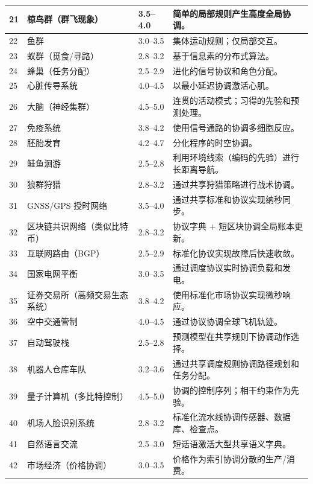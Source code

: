 \documentclass[11pt,a4paper]{article}
\begin{document}
\begin{longtable}{|p{0.8cm}|p{6.2cm}|p{3.0cm}|p{5.7cm}|}
	\hline
	21 & 椋鸟群（群飞现象） & 3.5--4.0 & 简单的局部规则产生高度全局协调。 \\
	\hline
	22 & 鱼群 & 3.0--3.5 & 集体运动规则；仅局部交互。 \\
	\hline
	23 & 蚁群（觅食/寻路） & 2.8--3.2 & 基于信息素的分布式算法。 \\
	\hline
	24 & 蜂巢（任务分配） & 2.5--2.9 & 进化的信号协议和角色分配。 \\
	\hline
	25 & 心脏传导系统 & 4.0--4.5 & 以最小延迟协调激活心肌。 \\
	\hline
	26 & 大脑（神经集群） & 4.5--5.0 & 连贯的活动模式；习得的先验和预测处理。 \\
	\hline
	27 & 免疫系统 & 3.8--4.2 & 使用信号通路的协调多细胞反应。 \\
	\hline
	28 & 胚胎发育 & 4.2--4.7 & 分化程序的时空协调。 \\
	\hline
	29 & 鲑鱼洄游 & 2.5--2.8 & 利用环境线索（编码的先验）进行长距离导航。 \\
	\hline
	30 & 狼群狩猎 & 2.8--3.2 & 通过共享狩猎策略进行战术协调。 \\
	\hline
	31 & GNSS/GPS 授时网络 & 3.5--4.0 & 通过共享标准和协议实现纳秒同步。 \\
	\hline
	32 & 区块链共识网络（类似比特币） & 2.8--3.2 & 协议字典 + 短区块协调全局账本更新。 \\
	\hline
	33 & 互联网路由（BGP） & 2.5--2.9 & 标准化协议实现故障后快速收敛。 \\
	\hline
	34 & 国家电网平衡 & 3.0--3.5 & 通过调度协议实时协调负载和发电。 \\
	\hline
	35 & 证券交易所（高频交易生态系统） & 3.8--4.2 & 使用标准化市场协议实现微秒响应。 \\
	\hline
	36 & 空中交通管制 & 4.0--4.5 & 通过协议协调全球飞机轨迹。 \\
	\hline
	37 & 自动驾驶栈 & 2.5--2.8 & 预测模型在共享规则下协调动作选择。 \\
	\hline
	38 & 机器人仓库车队 & 3.2--3.6 & 通过共享调度规则协调路径规划和任务分配。 \\
	\hline
	39 & 量子计算机（多比特控制） & 4.5--5.0 & 协调的控制序列；相干约束作为先验。 \\
	\hline
	40 & 机场人脸识别系统 & 2.8--3.2 & 标准化流水线协调传感器、数据库、检查点。 \\
	\hline
	41 & 自然语言交流 & 2.5--3.0 & 短话语激活大型共享语义字典。 \\
	\hline
	42 & 市场经济（价格协调） & 3.0--3.5 & 价格作为索引协调分散的生产/消费。 \\
	\hline

\end{longtable}
\end{document}
